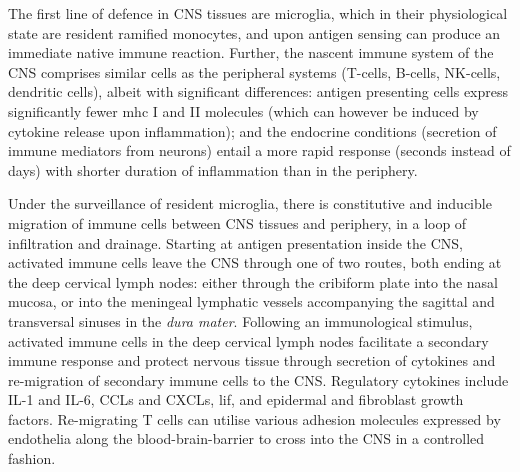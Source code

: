 The first line of defence in CNS tissues are microglia, which in their physiological state are resident ramified monocytes, and upon antigen sensing can produce an immediate native immune reaction. Further, the nascent immune system of the CNS comprises similar cells as the peripheral systems (T-cells, B-cells, NK-cells, dendritic cells), albeit with significant differences: antigen presenting cells express significantly fewer \ac{mhc} I and II molecules (which can however be induced by cytokine release upon inflammation); and the endocrine conditions (secretion of immune mediators from neurons) entail a more rapid response (seconds instead of days) with shorter duration of inflammation than in the periphery.\cite{Negi2018}

Under the surveillance of resident microglia, there is constitutive and inducible migration of immune cells between CNS tissues and periphery, in a loop of infiltration and drainage. Starting at antigen presentation inside the CNS, activated immune cells leave the CNS through one of two routes, both ending at the deep cervical lymph nodes: either through the cribiform plate into the nasal mucosa, or into the meningeal lymphatic vessels accompanying the sagittal and transversal sinuses in the \emph{dura mater}. Following an immunological stimulus, activated immune cells in the deep cervical lymph nodes facilitate a secondary immune response and protect nervous tissue through secretion of cytokines\cite{Walsh2015} and re-migration of secondary immune cells to the CNS. Regulatory cytokines include IL-1 and IL-6, CCLs and CXCLs, \ac{lif}, and epidermal and fibroblast growth factors. Re-migrating T cells can utilise various adhesion molecules expressed by endothelia along the blood-brain-barrier to cross into the CNS in a controlled fashion.\cite{Negi2018}



